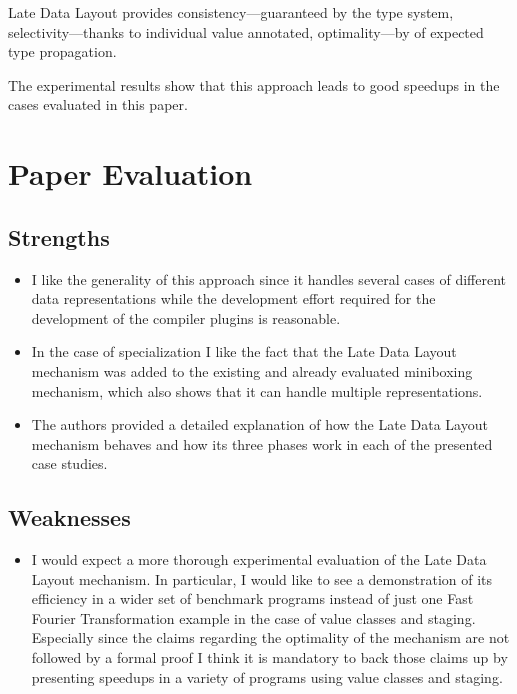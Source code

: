 \documentclass{article} \usepackage{hyperref} \usepackage{graphicx}
\begin{document}
Late Data Layout provides consistency---guaranteed by the type system,
selectivity---thanks to individual value annotated, optimality---by of
expected type propagation.

The experimental results show that this approach leads to good
speedups in the cases evaluated in this paper.

\section{Paper Evaluation}
\subsection{Strengths}
\begin{itemize}
\item I like the generality of this approach since it handles several
cases of different data representations while the development effort
required for the development of the compiler plugins is reasonable.
\item In the case of specialization I like the fact that the Late Data
Layout mechanism was added to the existing and already evaluated
miniboxing mechanism, which also shows that it can handle multiple
representations.
\item The authors provided a detailed explanation of how the Late Data
  Layout mechanism behaves and how its three phases work in each of
  the presented case studies.
\end{itemize}

\subsection{Weaknesses}
\begin{itemize}
\item I would expect a more thorough experimental evaluation of the
Late Data Layout mechanism. In particular, I would like to see a
demonstration of its efficiency in a wider set of benchmark programs
instead of just one Fast Fourier Transformation example in the case of
value classes and staging. Especially since the claims regarding the
optimality of the mechanism are not followed by a formal proof I think
it is mandatory to back those claims up by presenting speedups in a
variety of programs using value classes and staging. 
\end{itemize}
\end{document}
